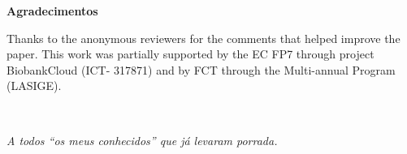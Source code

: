 \pagestyle{plain}

\vspace*{2cm}
\begin{center}
\Large \bf Agradecimentos
\end{center}
\vspace*{1cm} \setlength{\baselineskip}{0.6cm}


Thanks to the anonymous reviewers for the comments that helped improve the paper. This work was partially supported by the EC FP7 through project BiobankCloud (ICT- 317871) and by FCT through the Multi-annual Program (LASIGE).

\LIMPA
\LIMPA

~
\vfill

\begin{flushright}\textit{A todos ``os meus conhecidos''  que já levaram porrada. }\end{flushright}

\LIMPA
